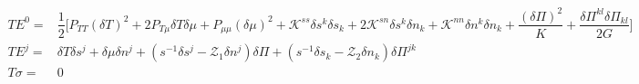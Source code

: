 \documentclass[aps,prl,singlecolumn,nofootinbib]{revtex4-2}
\theoremstyle{definition}
\theoremstyle{theorem}
\begin{document}
\begin{equation}\label{infosupsol}
\begin{split}
TE^0 ={}& \dfrac{1}{2} \bigg[P_{TT} (\delta T)^2 +2 P_{T\mu} \delta T \delta \mu + P_{\mu \mu} (\delta \mu)^2   + \mathcal{K}^{ss}\delta s^k \delta s_k + 2\mathcal{K}^{sn}\delta s^k \delta n_k + \mathcal{K}^{nn}\delta n^k \delta n_k + \dfrac{(\delta \Pi)^2}{K} {+} \dfrac{\delta \Pi^{kl}\delta \Pi_{kl}}{2G} \bigg]   \\
TE^j ={}& \delta T \delta s^j +\delta \mu \delta n^j + (s^{-1} \delta s^j-\mathcal{Z}_1 \delta n^j) \delta \Pi  + (s^{-1} \delta s_k -\mathcal{Z}_2 \delta n_k) \delta \Pi^{jk}    \\
T\sigma ={}& 0  \\
\end{split}
\end{equation}







\label{lastpage}
\end{document}
